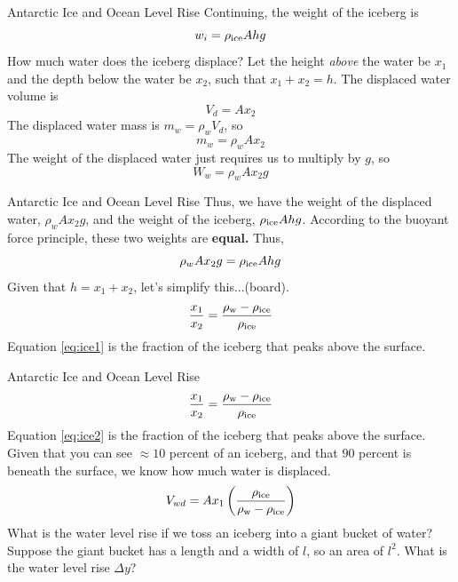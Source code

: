 \documentclass{beamer}
\begin{document}
\begin{frame}{Antarctic Ice and Ocean Level Rise}
\small
Continuing, the weight of the iceberg is
\begin{equation}
w_i = \rho_{\rm ice} A h g
\end{equation}
How much water does the iceberg displace?  Let the height \textit{above} the water be $x_1$ and the depth below the water be $x_2$, such that $x_1 + x_2 = h$.  The displaced water volume is
\begin{equation}
V_d = A x_2
\end{equation}
The displaced water mass is $m_w = \rho_{w} V_d$, so
\begin{equation}
m_w = \rho_{w} A x_2
\end{equation}
The weight of the displaced water just requires us to multiply by $g$, so
\begin{equation}
W_w = \rho_{w} A x_2 g
\end{equation}
\end{frame}

\begin{frame}{Antarctic Ice and Ocean Level Rise}
Thus, we have the weight of the displaced water, $\rho_{w} A x_2 g$, and the weight of the iceberg, $\rho_{\rm ice} A h g$. According to the buoyant force principle, these two weights are \textbf{equal.}  Thus, 
\begin{equation}
\rho_{w} A x_2 g = \rho_{\rm ice} A h g
\end{equation}
Given that $h = x_1 + x_2$, let's simplify this...(board).
\begin{equation}
\frac{x_1}{x_2} = \frac{\rho_{\rm w} - \rho_{\rm ice}}{\rho_{\rm ice}} \label{eq:ice1}
\end{equation}
Equation \ref{eq:ice1} is the fraction of the iceberg that peaks above the surface.
\end{frame}

\begin{frame}{Antarctic Ice and Ocean Level Rise}
\begin{equation}
\frac{x_1}{x_2} = \frac{\rho_{\rm w} - \rho_{\rm ice}}{\rho_{\rm ice}} \label{eq:ice2}
\end{equation}
Equation \ref{eq:ice2} is the fraction of the iceberg that peaks above the surface.  Given that you can see $\approx 10$ percent of an iceberg, and that $90$ percent is beneath the surface, we know how much water is displaced. \\
\begin{equation}
V_{wd} = A x_1 \left(\frac{\rho_{\rm ice}}{\rho_{\rm w} - \rho_{\rm ice}}\right)
\end{equation}
What is the water level rise if we toss an iceberg into a giant bucket of water? \\ \vspace{0.5cm}
Suppose the giant bucket has a length and a width of $l$, so an area of $l^2$.  What is the water level rise $\Delta y$?
\end{frame}
\end{document}

